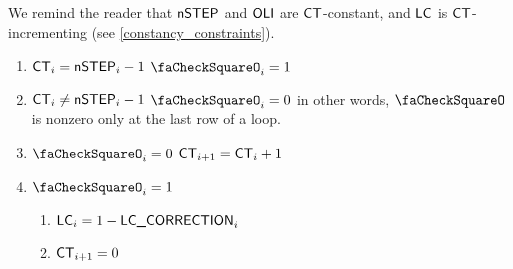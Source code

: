 \begin{center}
\end{center}
We remind the reader that $\textsf{nSTEP}$ and $\textsf{OLI}$ are $\textsf{CT}$-constant, and $\textsf{LC}$ is $\textsf{CT}$-incrementing (see \ref{constancy_constraints}).
\begin{enumerate}
    \item \If $\textsf{CT}_{i} = \textsf{nSTEP}_{i}-1$ \Then $\done_{i} = 1$ 
    \item \If $\textsf{CT}_{i} \neq \textsf{nSTEP}_{i}-1$ \Then $\done_{i} = 0$ in other words, $\done$ is nonzero only at the last row of a loop.
    \item \If $\done_{i} = 0$ \Then $\textsf{CT}_{i + 1} = \textsf{CT}_{i} + 1$
    \item \If $\done_{i} = 1$ \Then 
        \begin{enumerate}
            \item $\textsf{LC}_{i} = 1-\textsf{LC\_CORRECTION}_{i}$
            \item $\textsf{CT}_{i + 1} = 0$
        \end{enumerate}
\end{enumerate}
